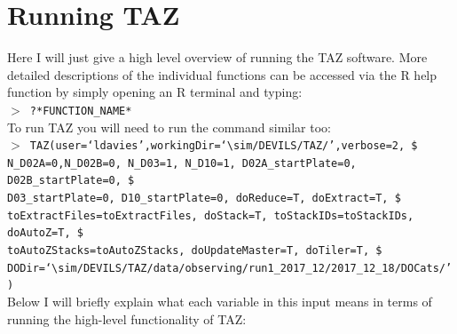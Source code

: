 \documentclass[12pt]{article}
\begin{document}
\section{Running TAZ}

Here I will just give a high level overview of running the TAZ software. More detailed descriptions of the individual functions can be accessed via the R help function by simply opening an R terminal and typing: \\


\hspace{10mm}  \texttt{$>$ ?*FUNCTION\_NAME*}\\

To run TAZ you will need to run the command similar too: \\

\hspace{10mm} \texttt{$>$ TAZ(user=`ldavies',workingDir=`$\sim$/DEVILS/TAZ/',verbose=2, \$ \\
N\_D02A=0,N\_D02B=0, N\_D03=1, N\_D10=1, D02A\_startPlate=0, D02B\_startPlate=0, \$ \\ 
D03\_startPlate=0, D10\_startPlate=0,  doReduce=T, doExtract=T,  \$ \\
toExtractFiles=toExtractFiles, doStack=T, toStackIDs=toStackIDs, doAutoZ=T, \$ \\
toAutoZStacks=toAutoZStacks, doUpdateMaster=T, doTiler=T, \$ \\
DODir=`$\sim$/DEVILS/TAZ/data/observing/run1\_2017\_12/2017\_12\_18/DOCats/')} \\

Below I will briefly explain what each variable in this input means in terms of running the high-level functionality of TAZ:\\
\end{document}
